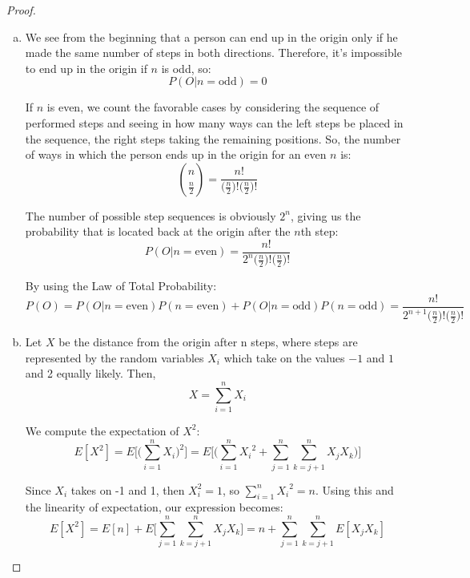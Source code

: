 \begin{proof}
    \hfill
    \begin{enumerate}[(a)]
        \item We see from the beginning that a person can end up in the origin only
            if he made the same number of steps in both directions. Therefore, it's
            impossible to end up in the origin if $n$ is odd, so: 
            \[
                P(O | n = \text{odd}) = 0
            \] 

            If $n$ is even, we
            count the favorable cases by considering the sequence of performed steps
            and seeing in how many ways can the left steps be placed in the sequence,
            the right steps taking the remaining positions. So, the number
            of ways in which the person ends up in the origin for an even $n$ is:
             \[
                 \binom{n}{\frac{n}{2}} = \frac{n!}{\big(\frac{n}{2}\big)!\big(\frac{n}{2}\big)!}
            \] 

            The number of possible step sequences is obviously $2^n$, giving us the 
            probability that is located back at the origin after the $n$th step:
            \[
                P(O | n = \text{even}) = \frac{n!}{2^n\big(\frac{n}{2}\big)!\big(\frac{n}{2}\big)!}
            \] 

            By using the Law of Total Probability:
            \[
                P(O) = P(O | n = \text{even})P(n = \text{even}) + P(O | n = \text{odd})P(n = \text{odd}) 
                = \frac{n!}{2^{n+1}\big(\frac{n}{2}\big)!\big(\frac{n}{2}\big)!}
            \] 

        \item Let $X$ be the distance from the origin after n steps, where steps are represented
            by the random variables $X_i$ which take on the values $-1$ and $1$ and 2 equally likely. Then,
            \[
                X = \sum_{i = 1}^{n} X_i
            \] 

            We compute the expectation of $X^2$:
            \[
                E[X^2] = E\bigg[\bigg(\sum_{i = 1}^n X_i\bigg)^2\bigg] 
                = E\bigg[\bigg(\sum_{i = 1}^n {X_i}^2 + \sum_{j = 1}^n\sum_{k = j+1}^n X_jX_k\bigg)\bigg]
            \] 

            Since $X_i$ takes on -1 and 1, then $X_i^2 = 1$, so $\displaystyle \sum_{i = 1}^n {X_i}^2 = n$.
            Using this and the linearity of expectation, our expression becomes:
            \[
                E[X^2] = E[n] + E\bigg[\sum_{j = 1}^n\sum_{k = j+1}^n X_jX_k\bigg]
                = n + \sum_{j = 1}^n\sum_{k = j+1}^n E[X_jX_k]
            \] 


\end{enumerate}
\end{proof}
